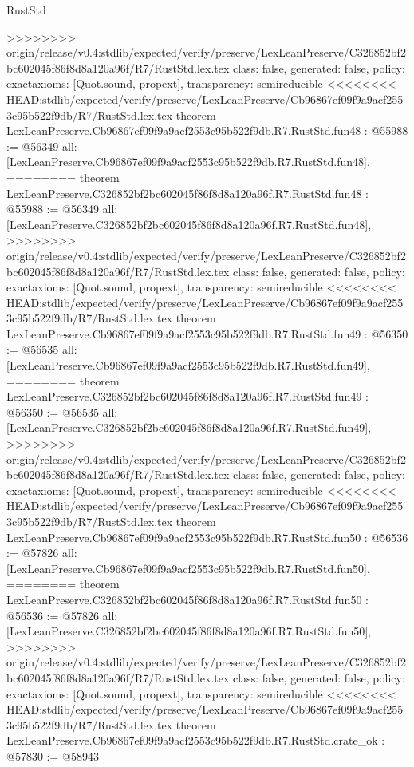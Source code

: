 \begin{lexlean}{RustStd}
\begin{coremodule}
{\begin{coremodule}
{{{{{{{{{{{{{{{{{{{{{{{{{{{{{{{{{{{{{{{{{{{{{{{{{{{>>>>>>>> origin/release/v0.4:stdlib/expected/verify/preserve/LexLeanPreserve/C326852bf2bc602045f86f8d8a120a96f/R7/RustStd.lex.tex
  class: false,
  generated: false,
  policy: exact{axioms: [Quot.sound, propext]},
  transparency: semireducible
}
<<<<<<<< HEAD:stdlib/expected/verify/preserve/LexLeanPreserve/Cb96867ef09f9a9acf2553c95b522f9db/R7/RustStd.lex.tex
theorem LexLeanPreserve.Cb96867ef09f9a9acf2553c95b522f9db.R7.RustStd.fun48 : @55988 := @56349 {
  all: [LexLeanPreserve.Cb96867ef09f9a9acf2553c95b522f9db.R7.RustStd.fun48],
========
theorem LexLeanPreserve.C326852bf2bc602045f86f8d8a120a96f.R7.RustStd.fun48 : @55988 := @56349 {
  all: [LexLeanPreserve.C326852bf2bc602045f86f8d8a120a96f.R7.RustStd.fun48],
>>>>>>>> origin/release/v0.4:stdlib/expected/verify/preserve/LexLeanPreserve/C326852bf2bc602045f86f8d8a120a96f/R7/RustStd.lex.tex
  class: false,
  generated: false,
  policy: exact{axioms: [Quot.sound, propext]},
  transparency: semireducible
}
<<<<<<<< HEAD:stdlib/expected/verify/preserve/LexLeanPreserve/Cb96867ef09f9a9acf2553c95b522f9db/R7/RustStd.lex.tex
theorem LexLeanPreserve.Cb96867ef09f9a9acf2553c95b522f9db.R7.RustStd.fun49 : @56350 := @56535 {
  all: [LexLeanPreserve.Cb96867ef09f9a9acf2553c95b522f9db.R7.RustStd.fun49],
========
theorem LexLeanPreserve.C326852bf2bc602045f86f8d8a120a96f.R7.RustStd.fun49 : @56350 := @56535 {
  all: [LexLeanPreserve.C326852bf2bc602045f86f8d8a120a96f.R7.RustStd.fun49],
>>>>>>>> origin/release/v0.4:stdlib/expected/verify/preserve/LexLeanPreserve/C326852bf2bc602045f86f8d8a120a96f/R7/RustStd.lex.tex
  class: false,
  generated: false,
  policy: exact{axioms: [Quot.sound, propext]},
  transparency: semireducible
}
<<<<<<<< HEAD:stdlib/expected/verify/preserve/LexLeanPreserve/Cb96867ef09f9a9acf2553c95b522f9db/R7/RustStd.lex.tex
theorem LexLeanPreserve.Cb96867ef09f9a9acf2553c95b522f9db.R7.RustStd.fun50 : @56536 := @57826 {
  all: [LexLeanPreserve.Cb96867ef09f9a9acf2553c95b522f9db.R7.RustStd.fun50],
========
theorem LexLeanPreserve.C326852bf2bc602045f86f8d8a120a96f.R7.RustStd.fun50 : @56536 := @57826 {
  all: [LexLeanPreserve.C326852bf2bc602045f86f8d8a120a96f.R7.RustStd.fun50],
>>>>>>>> origin/release/v0.4:stdlib/expected/verify/preserve/LexLeanPreserve/C326852bf2bc602045f86f8d8a120a96f/R7/RustStd.lex.tex
  class: false,
  generated: false,
  policy: exact{axioms: [Quot.sound, propext]},
  transparency: semireducible
}
<<<<<<<< HEAD:stdlib/expected/verify/preserve/LexLeanPreserve/Cb96867ef09f9a9acf2553c95b522f9db/R7/RustStd.lex.tex
theorem LexLeanPreserve.Cb96867ef09f9a9acf2553c95b522f9db.R7.RustStd.crate_ok : @57830 := @58943 {
}}}}}}}}}}}}}}}}}}}}}}}}}}}}}}}}}}}}}}}}}}}}}}}}}}}}}}
\end{coremodule}}
\end{coremodule}
\end{lexlean}
